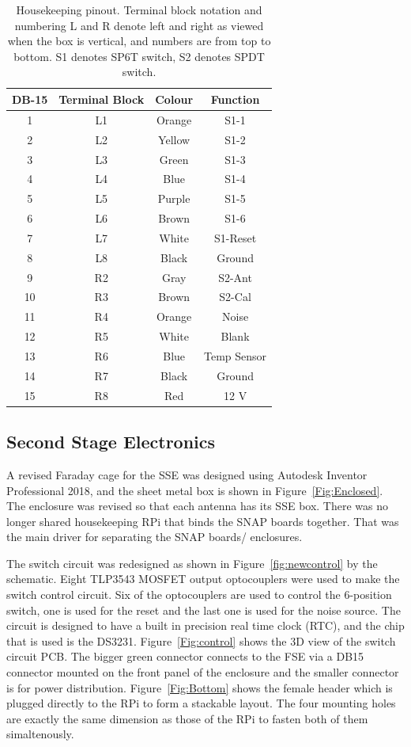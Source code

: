 \begin{table}
	\centering
	\begin{tabular}{ c|c|c|c} 
		\hline
		DB-15 & Terminal Block & Colour & Function \\
		\hline
		\hline
		1 & L1 & Orange & S1-1 \\ 
		2 & L2 & Yellow & S1-2 \\ 
		3 & L3 & Green & S1-3 \\
		4 & L4 & Blue & S1-4 \\
		5 & L5 & Purple & S1-5 \\
		6 & L6 & Brown & S1-6 \\
		7 & L7 & White & S1-Reset \\
		8 & L8 & Black & Ground \\
		9 & R2 & Gray & S2-Ant \\
		10 & R3 & Brown & S2-Cal \\
		11 & R4 & Orange & Noise \\
		12 & R5 & White & Blank \\
		13 & R6 & Blue & Temp Sensor \\
		14 & R7 & Black & Ground \\
		15 & R8 & Red & 12 V \\
		\hline
	\end{tabular}
	\caption{Housekeeping pinout. Terminal block notation and numbering L and R denote left and right as viewed when the box is vertical, and numbers are from top to bottom. S1 denotes SP6T switch, S2 denotes SPDT switch.}
	\label{Tab:Pinout}
\end{table}


\subsection{Second Stage Electronics}

A revised Faraday cage for the SSE was designed using Autodesk Inventor Professional 2018, and the sheet metal box is shown in Figure~\ref{Fig:Enclosed}. The enclosure was revised so that each antenna has its SSE box.  There was no longer shared housekeeping RPi that binds the SNAP boards together. That was the main driver for separating the SNAP boards/ enclosures.

The switch circuit was redesigned as shown in Figure~\ref{fig:newcontrol} by the schematic. Eight TLP3543 MOSFET output optocouplers were used to make the switch control circuit. Six of the optocouplers are used to control the 6-position switch, one is used for the reset and the last one is used for the noise source. The circuit is designed to have a built in precision real time clock (RTC), and the chip that is used is the DS3231. Figure~\ref{Fig:control} shows the 3D view of the switch circuit PCB. The bigger green connector connects to the FSE via a DB15 connector mounted on the front panel of the enclosure and the smaller connector is for power distribution. Figure~\ref{Fig:Bottom} shows the female header which is plugged directly to the RPi to form a stackable layout. The four mounting holes are exactly the same dimension as those of the RPi to fasten both of them simaltenously.

